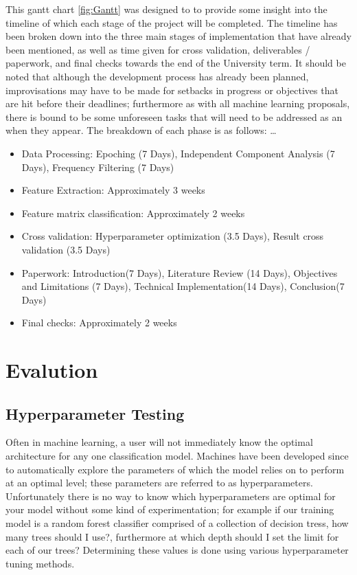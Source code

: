\documentclass[12pt]{article}
\begin{document}
This gantt chart \ref{fig:Gantt} was designed to to provide some insight into the timeline of which each stage of the project will be completed. The timeline has been broken down into the three main stages of implementation that have already been mentioned, as well as time given for cross validation, deliverables / paperwork, and final checks towards the end of the University term. It should be noted that although the development process has already been planned, improvisations may have to be made for setbacks in progress or objectives that are hit before their deadlines; furthermore as with all machine learning proposals, there is bound to be some unforeseen tasks that will need to be addressed as an when they appear. The breakdown of each phase is as follows:
\dots
\begin{itemize}
\item Data Processing: Epoching (7 Days), Independent Component Analysis (7 Days), Frequency Filtering (7 Days)
\item Feature Extraction: Approximately 3 weeks
\item Feature matrix classification: Approximately 2 weeks
\item Cross validation: Hyperparameter optimization (3.5 Days), Result cross validation (3.5 Days)
\item Paperwork: Introduction(7 Days), Literature Review (14  Days), Objectives and Limitations (7 Days), Technical Implementation(14 Days), Conclusion(7 Days)
\item Final checks: Approximately 2 weeks 
\end{itemize}

\section{Evalution}
\subsection{Hyperparameter Testing}

Often in machine learning, a user will not immediately know the optimal architecture for any one classification model. Machines have been developed since to automatically explore the parameters of which the model relies on to perform at an optimal level; these parameters are referred to as hyperparameters. Unfortunately there is no way to know which hyperparameters are optimal for your model without some kind of experimentation; for example if our training model is a random forest classifier comprised of a collection of decision tress, how many trees should I use?, furthermore at which depth should I set the limit for each of our trees? Determining these values is done using various hyperparameter tuning methods. 
\end{document}

